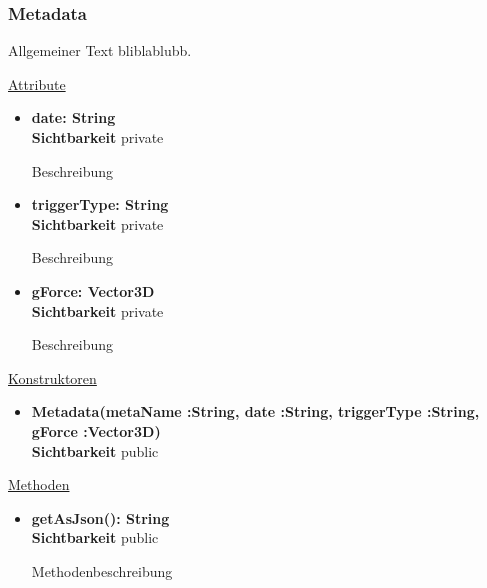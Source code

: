 \subsubsection{Metadata}
Allgemeiner Text bliblablubb. \newline

\underline{Attribute}
\begin{itemize}
\itemsep0pt
\item \textbf{date: String} \hfill\\ 
\textbf{Sichtbarkeit} private 

Beschreibung

\item \textbf{triggerType: String} \hfill\\ 
\textbf{Sichtbarkeit} private 

Beschreibung

\item \textbf{gForce: Vector3D} \hfill\\ 
\textbf{Sichtbarkeit} private 

Beschreibung

\end{itemize}

\underline{Konstruktoren}
\begin{itemize}
\itemsep0pt
\item \textbf{Metadata(metaName :String, date :String, triggerType :String, gForce :Vector3D)} \hfill\\
\textbf{Sichtbarkeit} public 

\end{itemize}

\underline{Methoden}
\begin{itemize}
\itemsep0pt
\item \textbf{getAsJson(): String}\hfill\\
\textbf{Sichtbarkeit} public 

Methodenbeschreibung

\end{itemize}